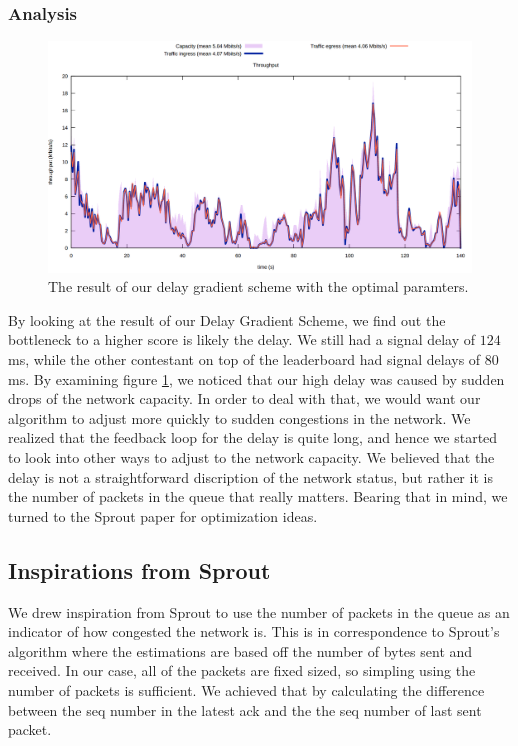\documentclass[11pt,a4paper]{article}
\begin{document}
\subsubsection{Analysis}
\begin{figure}[h]
  \includegraphics[scale=0.27]{contest2}
  \caption{The result of our delay gradient scheme with the optimal paramters.}
  \label{fig:cont3}
\end{figure}

By looking at the result of our Delay Gradient Scheme, we find out the
bottleneck to a higher score is likely the delay. We still had a signal delay of
$124$ ms, while the other contestant on top of the leaderboard had signal delays
of $80$ ms. By examining figure \ref{fig:cont3}, we noticed that our high delay
was caused by sudden drops of the network capacity. In order to deal with that,
we would want our algorithm to adjust more quickly to sudden congestions in the
network. We realized that the feedback loop for the delay is quite long, and
hence we started to look into other ways to adjust to the network capacity. We
believed that the delay is not a straightforward discription of the network
status, but rather it is the number of packets in the queue that really matters.
Bearing that in mind, we turned to the Sprout paper
\cite{winstein2013stochastic} for optimization ideas.

\subsection{Inspirations from Sprout}

We drew inspiration from Sprout to use the number of packets in the queue as an
indicator of how congested the network is. This is in correspondence to Sprout's
algorithm where the estimations are based off the number of bytes sent and
received. In our case, all of the packets are fixed sized, so simpling using the
number of packets is sufficient. We achieved that by calculating the difference
between the seq number in the latest ack and the the seq number of last sent
packet.
\end{document}
